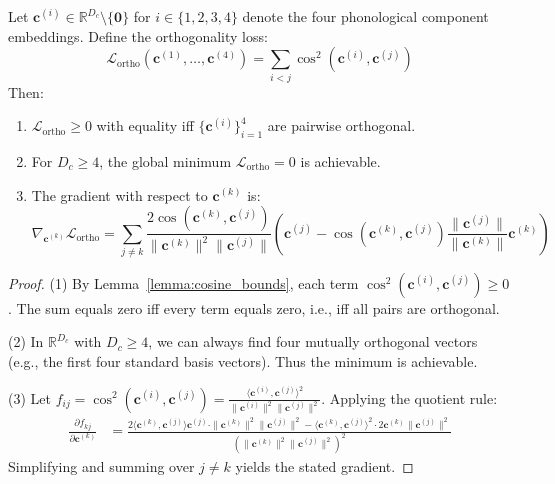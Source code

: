 \documentclass{article}
\begin{document}
\begin{theorem}
\label{thm:ortho}
Let $\mathbf{c}^{(i)} \in \mathbb{R}^{D_c} \setminus \{\mathbf{0}\}$ for $i \in \{1,2,3,4\}$ denote the four phonological component embeddings. Define the orthogonality loss:
\begin{equation}
\mathcal{L}_{\text{ortho}}(\mathbf{c}^{(1)}, \ldots, \mathbf{c}^{(4)}) = \sum_{i < j} \cos^2(\mathbf{c}^{(i)}, \mathbf{c}^{(j)})
\end{equation}
Then:
\begin{enumerate}[nosep]
\item $\mathcal{L}_{\text{ortho}} \geq 0$ with equality iff $\{\mathbf{c}^{(i)}\}_{i=1}^4$ are pairwise orthogonal.
\item For $D_c \geq 4$, the global minimum $\mathcal{L}_{\text{ortho}} = 0$ is achievable.
\item The gradient with respect to $\mathbf{c}^{(k)}$ is:
\begin{equation}
\nabla_{\mathbf{c}^{(k)}} \mathcal{L}_{\text{ortho}} = \sum_{j \neq k} \frac{2 \cos(\mathbf{c}^{(k)}, \mathbf{c}^{(j)})}{\|\mathbf{c}^{(k)}\|^2 \|\mathbf{c}^{(j)}\|} \left( \mathbf{c}^{(j)} - \cos(\mathbf{c}^{(k)}, \mathbf{c}^{(j)}) \frac{\|\mathbf{c}^{(j)}\|}{\|\mathbf{c}^{(k)}\|} \mathbf{c}^{(k)} \right)
\end{equation}
\end{enumerate}
\end{theorem}

\begin{proof}
(1) By Lemma~\ref{lemma:cosine_bounds}, each term $\cos^2(\mathbf{c}^{(i)}, \mathbf{c}^{(j)}) \geq 0$. The sum equals zero iff every term equals zero, i.e., iff all pairs are orthogonal.

(2) In $\mathbb{R}^{D_c}$ with $D_c \geq 4$, we can always find four mutually orthogonal vectors (e.g., the first four standard basis vectors). Thus the minimum is achievable.

(3) Let $f_{ij} = \cos^2(\mathbf{c}^{(i)}, \mathbf{c}^{(j)}) = \frac{\langle \mathbf{c}^{(i)}, \mathbf{c}^{(j)} \rangle^2}{\|\mathbf{c}^{(i)}\|^2 \|\mathbf{c}^{(j)}\|^2}$. Applying the quotient rule:
\begin{align}
\frac{\partial f_{kj}}{\partial \mathbf{c}^{(k)}} &= \frac{2\langle \mathbf{c}^{(k)}, \mathbf{c}^{(j)} \rangle \mathbf{c}^{(j)} \cdot \|\mathbf{c}^{(k)}\|^2 \|\mathbf{c}^{(j)}\|^2 - \langle \mathbf{c}^{(k)}, \mathbf{c}^{(j)} \rangle^2 \cdot 2\mathbf{c}^{(k)} \|\mathbf{c}^{(j)}\|^2}{(\|\mathbf{c}^{(k)}\|^2 \|\mathbf{c}^{(j)}\|^2)^2}
\end{align}
Simplifying and summing over $j \neq k$ yields the stated gradient.
\end{proof}
\end{document}
